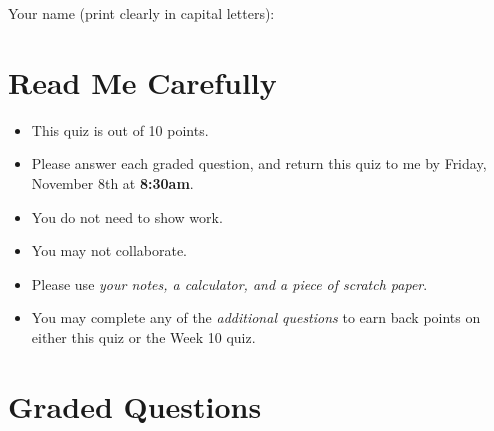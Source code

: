 \documentclass{ccg-topic}
\author{Colton Grainger}
\date{2019-11-08}
\begin{document}
\maketitle

Your name (print clearly in capital letters): \underline{\hspace{8cm}}

\section*{Read Me Carefully}
\begin{itemize}
    \item This quiz is out of 10 points. 
    \item Please answer each graded question, and return this quiz to me by Friday, November 8th at \textbf{8:30am}.
    \item You do not need to show work.
    \item You may not collaborate. 
    \item Please use \emph{your notes, a calculator, and a piece of scratch paper}. 
    \item You may complete any of the \emph{additional questions} to earn back points on either this quiz or the Week 10 quiz.
\end{itemize}

\section*{Graded Questions}
\end{document}
